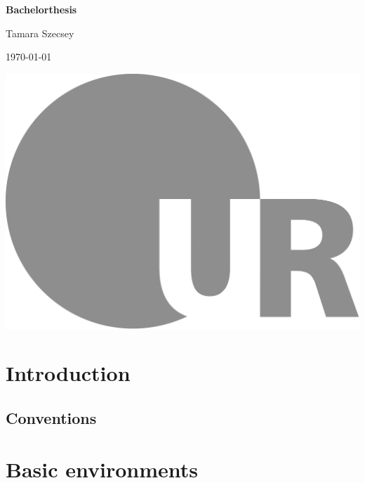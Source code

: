\documentclass[english, a4, 12pt]{scrartcl}
\begin{document}

	\begin{titlepage}
		\begin{minipage}[c][\textheight][c]{\textwidth}
			\begin{center}
				{ \Huge \textbf{Bachelorthesis} }
				
				\vspace*{1cm}
				{\Large Tamara Szecsey}
				
				\vspace*{1cm}
				{\Large \today}
				
				\vspace*{4cm}
				\hspace*{1cm} \includegraphics[height=30ex]{LOGO_UR}
			\end{center}
		\end{minipage}
	\end{titlepage}
	
\thispagestyle{empty}
\tableofcontents	
\clearpage	
\setcounter{page}{1}
\section{Introduction}
	\cite{JerusalemLectures}
	\subsection{Conventions}
\section{Basic environments}
	
	 

	
	 	
\end{document}
